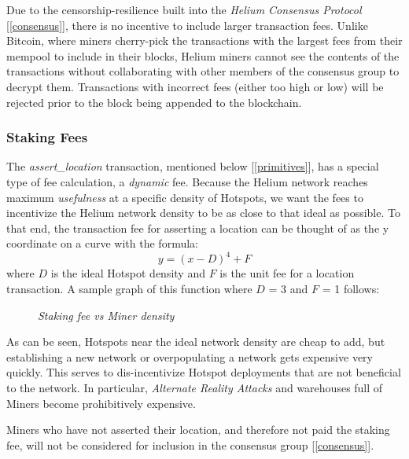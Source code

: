 \documentclass[10pt, nonatbib, nocopyrightspace, reprint]{sigplanconf}
\newcommand{\secref}[1]{[\autoref{#1}]}
\begin{document}
Due to the censorship-resilience built into the \emph{Helium Consensus Protocol} \secref{consensus}, there is no incentive to include larger transaction fees. Unlike Bitcoin, where miners cherry-pick the transactions with the largest fees from their mempool to include in their blocks, Helium miners cannot see the contents of the transactions without collaborating with other members of the consensus group to decrypt them. Transactions with incorrect fees (either too high or low) will be rejected prior to the block being appended to the blockchain.

\subsubsection{Staking Fees} \label{staking}

The \emph{assert\_location} transaction, mentioned below \secref{primitives}, has a special type of fee calculation, a \emph{dynamic} fee. Because the Helium network reaches maximum \emph{usefulness} at a specific density of Hotspots, we want the fees to incentivize the Helium network density to be as close to that ideal as possible. To that end, the transaction fee for asserting a location can be thought of as the y coordinate on a curve with the formula: \[\mathit{y = \left(x - D\right)^4 + F}\] where $D$ is the ideal Hotspot density and $F$ is the unit fee for a location transaction. A sample graph of this function where $D$ = 3 and $F$ = 1 follows:

\begin{figure}[ht]
  \centering
  \pgfplotsset{width=11cm,compat=newest}
  \caption{\emph{Staking fee vs Miner density}}
\end{figure}


As can be seen, Hotspots near the ideal network density are cheap to add, but establishing a new network or overpopulating a network gets expensive very quickly. This serves to dis-incentivize Hotspot deployments that are not beneficial to the network. In particular, \emph{Alternate Reality Attacks} and warehouses full of Miners become prohibitively expensive.

Miners who have not asserted their location, and therefore not paid the staking fee, will not be considered for inclusion in the consensus group \secref{consensus}.
\end{document}
